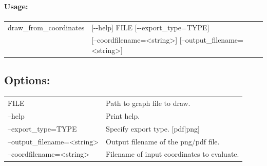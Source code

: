 \documentclass[11pt]{article}
\begin{document}
\paragraph*{Usage:\\} 

\begin{tabular}{ll}
 draw\_from\_coordinates&   [-{}-help] FILE [-{}-export\_type=TYPE]  \\
& [--coordfilename=<string>] [--output\_filename=<string>]



\end{tabular}
                          
\subsection*{Options:\\}

\begin{tabularx}{\textwidth}{lX}
  FILE                          & Path to graph file to draw.\\
  --help                        & Print help. \\
  --export\_type=TYPE           & Specify export type. [pdf|png]\\
  --output\_filename=<string>   & Output filename of the png/pdf file. \\
  --coordfilename=<string>      & Filename of input coordinates to evaluate. \\
\end{tabularx}

\end{document}
